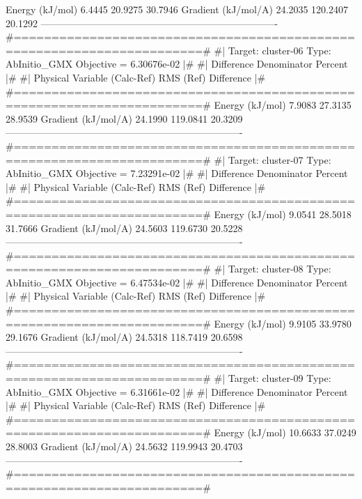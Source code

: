 \begin{DoxyVerb}
    Energy (kJ/mol)                 6.4445       20.9275     30.7946%
    Gradient (kJ/mol/A)            24.2035      120.2407     20.1292%
-------------------------------------------------------------------------
#=======================================================================#
#|  Target: cluster-06 Type: AbInitio_GMX Objective = 6.30676e-02      |#
#|                              Difference   Denominator     Percent   |#
#|  Physical Variable           (Calc-Ref)     RMS (Ref)   Difference  |#
#=======================================================================#
    Energy (kJ/mol)                 7.9083       27.3135     28.9539%
    Gradient (kJ/mol/A)            24.1990      119.0841     20.3209%
-------------------------------------------------------------------------
#=======================================================================#
#|  Target: cluster-07 Type: AbInitio_GMX Objective = 7.23291e-02      |#
#|                              Difference   Denominator     Percent   |#
#|  Physical Variable           (Calc-Ref)     RMS (Ref)   Difference  |#
#=======================================================================#
    Energy (kJ/mol)                 9.0541       28.5018     31.7666%
    Gradient (kJ/mol/A)            24.5603      119.6730     20.5228%
-------------------------------------------------------------------------
#=======================================================================#
#|  Target: cluster-08 Type: AbInitio_GMX Objective = 6.47534e-02      |#
#|                              Difference   Denominator     Percent   |#
#|  Physical Variable           (Calc-Ref)     RMS (Ref)   Difference  |#
#=======================================================================#
    Energy (kJ/mol)                 9.9105       33.9780     29.1676%
    Gradient (kJ/mol/A)            24.5318      118.7419     20.6598%
-------------------------------------------------------------------------
#=======================================================================#
#|  Target: cluster-09 Type: AbInitio_GMX Objective = 6.31661e-02      |#
#|                              Difference   Denominator     Percent   |#
#|  Physical Variable           (Calc-Ref)     RMS (Ref)   Difference  |#
#=======================================================================#
    Energy (kJ/mol)                10.6633       37.0249     28.8003%
    Gradient (kJ/mol/A)            24.5632      119.9943     20.4703%
-------------------------------------------------------------------------
#=======================================================================#

\end{DoxyVerb}
